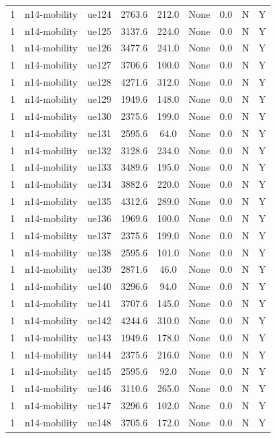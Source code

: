 \begin{table}[ht]
\begin{tabular}{|c|c|c|c|c|c|c|c|c|}
1 & n14-mobility & ue124 & 2763.6 & 212.0 & None & 0.0 & N & Y \\
1 & n14-mobility & ue125 & 3137.6 & 224.0 & None & 0.0 & N & Y \\
1 & n14-mobility & ue126 & 3477.6 & 241.0 & None & 0.0 & N & Y \\
1 & n14-mobility & ue127 & 3706.6 & 100.0 & None & 0.0 & N & Y \\
1 & n14-mobility & ue128 & 4271.6 & 312.0 & None & 0.0 & N & Y \\
1 & n14-mobility & ue129 & 1949.6 & 148.0 & None & 0.0 & N & Y \\
1 & n14-mobility & ue130 & 2375.6 & 199.0 & None & 0.0 & N & Y \\
1 & n14-mobility & ue131 & 2595.6 & 64.0 & None & 0.0 & N & Y \\
1 & n14-mobility & ue132 & 3128.6 & 234.0 & None & 0.0 & N & Y \\
1 & n14-mobility & ue133 & 3489.6 & 195.0 & None & 0.0 & N & Y \\
1 & n14-mobility & ue134 & 3882.6 & 220.0 & None & 0.0 & N & Y \\
1 & n14-mobility & ue135 & 4312.6 & 289.0 & None & 0.0 & N & Y \\
1 & n14-mobility & ue136 & 1969.6 & 100.0 & None & 0.0 & N & Y \\
1 & n14-mobility & ue137 & 2375.6 & 199.0 & None & 0.0 & N & Y \\
1 & n14-mobility & ue138 & 2595.6 & 101.0 & None & 0.0 & N & Y \\
1 & n14-mobility & ue139 & 2871.6 & 46.0 & None & 0.0 & N & Y \\
1 & n14-mobility & ue140 & 3296.6 & 94.0 & None & 0.0 & N & Y \\
1 & n14-mobility & ue141 & 3707.6 & 145.0 & None & 0.0 & N & Y \\
1 & n14-mobility & ue142 & 4244.6 & 310.0 & None & 0.0 & N & Y \\
1 & n14-mobility & ue143 & 1949.6 & 178.0 & None & 0.0 & N & Y \\
1 & n14-mobility & ue144 & 2375.6 & 216.0 & None & 0.0 & N & Y \\
1 & n14-mobility & ue145 & 2595.6 & 92.0 & None & 0.0 & N & Y \\
1 & n14-mobility & ue146 & 3110.6 & 265.0 & None & 0.0 & N & Y \\
1 & n14-mobility & ue147 & 3296.6 & 102.0 & None & 0.0 & N & Y \\
1 & n14-mobility & ue148 & 3705.6 & 172.0 & None & 0.0 & N & Y \\

\end{tabular}
\end{table}
